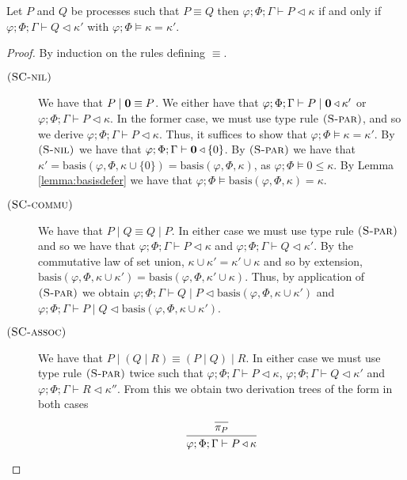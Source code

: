 \begin{lemma}
Let $P$ and $Q$ be processes such that $P\equiv Q$ then $\varphi;\Phi;\Gamma\vdash P \triangleleft \kappa$ if and only if $\varphi;\Phi;\Gamma\vdash Q \triangleleft \kappa'$ with $\varphi;\Phi\vDash \kappa = \kappa'$.
\begin{proof} By induction on the rules defining $\equiv$.
\begin{description}
\item[$\mbox{\textsc{\protect{(SC-nil})}}$] We have that $P \mid \mathbf{0} \equiv P$. We either have that $\varphi;\Phi;\Gamma\vdash P \mid \mathbf{0} \triangleleft \kappa'$ or $\varphi;\Phi;\Gamma\vdash P \triangleleft \kappa$. In the former case, we must use type rule $\mbox{\textsc{\protect{(S-par})}}$, and so we derive $\varphi;\Phi;\Gamma\vdash P \triangleleft \kappa$. Thus, it suffices to show that $\varphi;\Phi\vDash \kappa = \kappa'$. By $\mbox{\textsc{\protect{(S-nil})}}$ we have that $\varphi;\Phi;\Gamma\vdash \mathbf{0} \triangleleft \{0\}$. By $\mbox{\textsc{\protect{(S-par})}}$ we have that $\kappa'=\text{basis}(\varphi,\Phi,\kappa \cup \{0\}) = \text{basis}(\varphi,\Phi,\kappa)$, as $\varphi;\Phi\vDash 0 \leq \kappa$. By Lemma \ref{lemma:basisdefer} we have that $\varphi;\Phi\vDash\text{basis}(\varphi,\Phi,\kappa)=\kappa$.
%
\item[$\mbox{\textsc{\protect{(SC-commu})}}$] We have that $P\mid Q \equiv Q\mid P$. In either case we must use type rule $\mbox{\textsc{\protect{(S-par})}}$ and so we have that $\varphi;\Phi;\Gamma\vdash P \triangleleft \kappa$ and $\varphi;\Phi;\Gamma\vdash Q \triangleleft \kappa'$. By the commutative law of set union, $\kappa\cup\kappa'=\kappa'\cup\kappa$ and so by extension, $\text{basis}(\varphi,\Phi,\kappa\cup\kappa')=\text{basis}(\varphi,\Phi,\kappa'\cup\kappa)$. Thus, by application of $\mbox{\textsc{\protect{(S-par})}}$ we obtain $\varphi;\Phi;\Gamma\vdash Q \mid P \triangleleft \text{basis}(\varphi,\Phi,\kappa\cup\kappa')$ and $\varphi;\Phi;\Gamma\vdash P \mid Q \triangleleft \text{basis}(\varphi,\Phi,\kappa\cup\kappa')$.
%
\item[$\mbox{\textsc{\protect{(SC-assoc})}}$] We have that $P\mid (Q \mid R) \equiv (P\mid Q) \mid R$. In either case we must use type rule $\mbox{\textsc{\protect{(S-par})}}$ twice such that $\varphi;\Phi;\Gamma\vdash P \triangleleft \kappa$, $\varphi;\Phi;\Gamma\vdash Q \triangleleft \kappa'$ and
$\varphi;\Phi;\Gamma\vdash R \triangleleft \kappa''$. From this we obtain two derivation trees of the form in both cases
    \begin{align*}
        \begin{prooftree}
        \Infer0{\pi_P}
        \Infer1{\varphi;\Phi;\Gamma\vdash P \triangleleft \kappa}

\end{prooftree}
\end{align*}
\end{description}
\end{proof}
\end{lemma}
